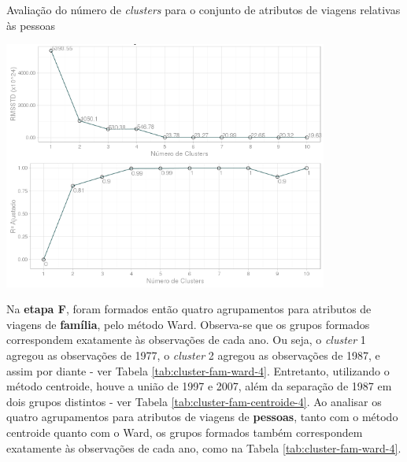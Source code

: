 \clearpage

\begin{grafico}[htb]%
    \caption{\label{graf:rmsstd-r2-cluster-pess-total}Avaliação do número de \textit{clusters} para o conjunto de atributos de viagens relativas às pessoas}%
    \begin{center}%
        \includegraphics[width=0.8\textwidth]{./imagens/No-clusters-R2-RMSSTD-pessoas.png}%
    \end{center}%
\end{grafico}%

Na \textbf{etapa F}, foram formados então quatro agrupamentos para atributos de viagens de \textbf{família}, pelo método Ward. Observa-se que os grupos formados correspondem exatamente às observações de cada ano. 
Ou seja, o \textit{cluster} 1 agregou as observações de 1977, o \textit{cluster} 2 agregou as observações de 1987, e assim por diante - ver Tabela \ref{tab:cluster-fam-ward-4}. Entretanto, utilizando o método centroide, houve a união de 1997 e 2007, além da separação de 1987 em dois grupos distintos - ver Tabela \ref{tab:cluster-fam-centroide-4}.
Ao analisar os quatro agrupamentos para atributos de viagens de \textbf{pessoas}, tanto com o método centroide quanto com o Ward, os grupos formados também correspondem exatamente às observações de cada ano, como na Tabela \ref{tab:cluster-fam-ward-4}.

